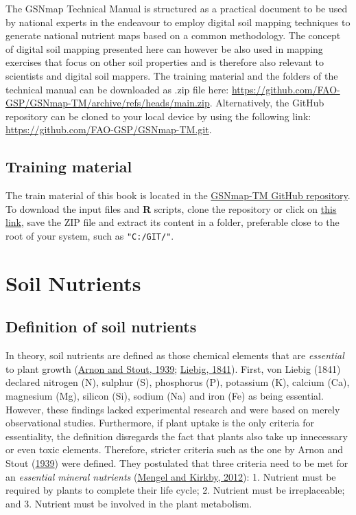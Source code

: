 \documentclass[
  10pt,
  b5paper,
  oneside]{book}
\begin{document}
The GSNmap Technical Manual is structured as a practical document to be used by national experts in the endeavour to employ digital soil mapping techniques to generate national nutrient maps based on a common methodology. The concept of digital soil mapping presented here can however be also used in mapping exercises that focus on other soil properties and is therefore also relevant to scientists and digital soil mappers. The training material and the folders of the technical manual can be downloaded as .zip file here: \url{https://github.com/FAO-GSP/GSNmap-TM/archive/refs/heads/main.zip}. Alternatively, the GitHub repository can be cloned to your local device by using the following link: \url{https://github.com/FAO-GSP/GSNmap-TM.git}.

\hypertarget{training-material}{%
\section{Training material}\label{training-material}}

The train material of this book is located in the \href{https://github.com/FAO-GSP/GSNmap-TM}{GSNmap-TM GitHub repository}. To download the input files and \textbf{R} scripts, clone the repository or click on \href{https://github.com/FAO-GSP/GSNmap-TM/archive/refs/heads/main.zip}{this link}, save the ZIP file and extract its content in a folder, preferable close to the root of your system, such as \texttt{"C:/GIT/"}.

\hypertarget{soil-nutrients}{%
\chapter{Soil Nutrients}\label{soil-nutrients}}

\hypertarget{definition-of-soil-nutrients}{%
\section{Definition of soil nutrients}\label{definition-of-soil-nutrients}}

In theory, soil nutrients are defined as those chemical elements that are \emph{essential} to plant growth (\protect\hyperlink{ref-arnon1939}{Arnon and Stout, 1939}; \protect\hyperlink{ref-vonLiebig1841}{Liebig, 1841}). First, von Liebig (1841) declared nitrogen (N), sulphur (S), phosphorus (P), potassium (K), calcium (Ca), magnesium (Mg), silicon (Si), sodium (Na) and iron (Fe) as being essential. However, these findings lacked experimental research and were based on merely observational studies. Furthermore, if plant uptake is the only criteria for essentiality, the definition disregards the fact that plants also take up innecessary or even toxic elements.
Therefore, stricter criteria such as the one by Arnon and Stout (\protect\hyperlink{ref-arnon1939}{1939}) were defined. They postulated that three criteria need to be met for an \emph{essential mineral nutrients} (\protect\hyperlink{ref-mengel2012}{Mengel and Kirkby, 2012}):
1. Nutrient must be required by plants to complete their life cycle;
2. Nutrient must be irreplaceable; and
3. Nutrient must be involved in the plant metabolism.
\end{document}
